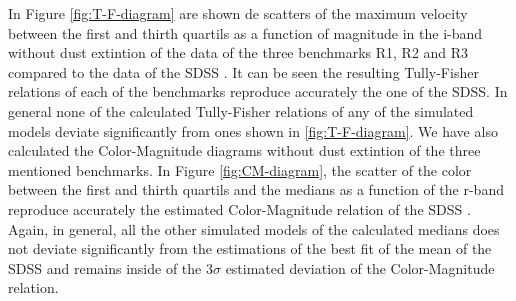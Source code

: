 \documentclass[usenatbib]{mn2e}
\begin{document}
In Figure \ref{fig:T-F-diagram} are shown de scatters of the maximum
velocity  between the first and thirth quartils  as a function of
magnitude in  the i-band without dust extintion of the data of the
three benchmarks R1, R2 and R3 compared to the data of the SDSS
\citep{2007AJ....134..945P}. It can be seen the resulting Tully-Fisher
relations of each of the benchmarks reproduce accurately the one of
the SDSS. In general none of the calculated Tully-Fisher relations of
any of the simulated models deviate significantly from ones shown in
\ref{fig:T-F-diagram}. We have also calculated the Color-Magnitude
diagrams without dust extintion of the three mentioned benchmarks. In
Figure \ref{fig:CM-diagram}, the scatter of the color between the
first and thirth quartils and the medians as a function of the r-band
reproduce accurately the estimated Color-Magnitude relation of the
SDSS \citep{2012MNRAS.423.1583M}. Again, in general, all the other
simulated models of the calculated medians does not deviate
significantly from the estimations of the best fit of the mean of the
SDSS and remains inside of the $3\sigma$ estimated deviation of the
Color-Magnitude relation. 
\end{document}
